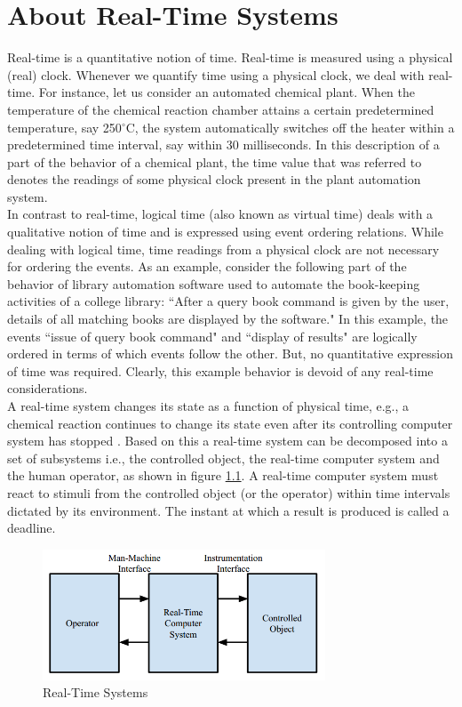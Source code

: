 \documentclass[12pt]{report}
\begin{document}
 \chapter{About Real-Time Systems}
Real-time is a quantitative notion of time. Real-time is measured using a physical (real) clock. Whenever we quantify time using a physical clock, we deal with real-time. For instance, let us consider an automated chemical plant. When the temperature of the chemical reaction chamber attains a certain predetermined temperature, say 250$^{\circ}$C, the system automatically switches off the heater within a predetermined time interval, say within 30 milliseconds. In this description of a part of the behavior of a chemical plant, the time value that was referred to denotes the readings of some physical clock present in the plant automation system.\\ 

In contrast to real-time, logical time (also known as virtual time) deals with a qualitative notion of time and is expressed using event ordering relations. While dealing with logical time, time readings from a physical clock are not necessary for ordering the events. As an example, consider the following part of the behavior of library automation software used to automate the book-keeping activities of a college library: ``After a query book command is given by the user, details of all matching books are displayed by the software." In this example, the events  ``issue of query book command" and ``display of results" are logically ordered in terms of which events follow the other. But, no quantitative expression of time was required. Clearly, this example behavior is devoid of any real-time considerations.\\

A real-time system changes its state as a function of physical time, e.g., a chemical reaction continues to change its state even after its controlling computer system has stopped \cite{rts}. Based on this a real-time system can be decomposed into a set of subsystems i.e., the controlled object, the real-time computer system and the human operator, as shown in figure \ref{fig:rts}. A real-time computer system must react to stimuli from the controlled object (or the operator) within time intervals dictated by its environment. The instant at which a result is produced is called a deadline. 

\begin{figure}[h]
    \centering
    \includegraphics[width=0.75\textwidth]{images/real-time-sys.png}
    \caption{Real-Time Systems}
    \label{fig:rts}
\end{figure}
\end{document}

